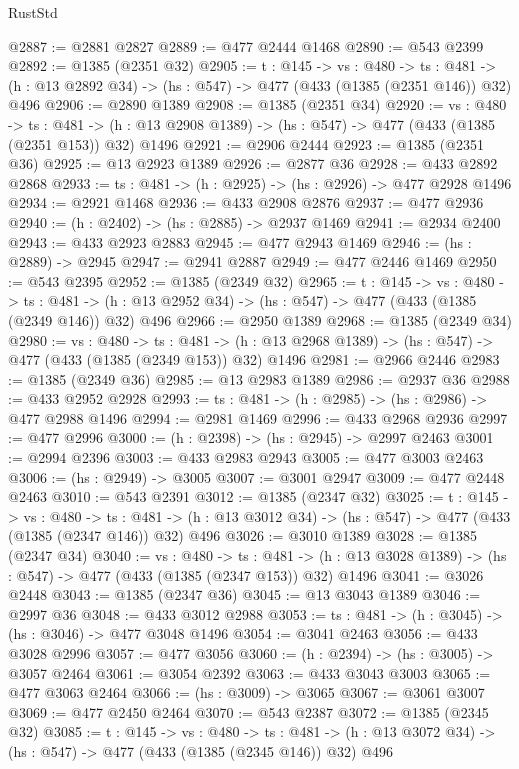 \begin{lexlean}{RustStd}
\begin{coremodule}
@2887 := @2881 @2827
@2889 := @477 @2444 @1468
@2890 := @543 @2399
@2892 := @1385 (@2351 @32)
@2905 := {t : @145} ->
  {vs : @480} ->
  {ts : @481} -> (h : @13 @2892 @34) -> (hs : @547) -> @477 (@433 (@1385 (@2351 @146)) @32) @496
@2906 := @2890 @1389
@2908 := @1385 (@2351 @34)
@2920 := {vs : @480} ->
  {ts : @481} -> (h : @13 @2908 @1389) -> (hs : @547) -> @477 (@433 (@1385 (@2351 @153)) @32) @1496
@2921 := @2906 @2444
@2923 := @1385 (@2351 @36)
@2925 := @13 @2923 @1389
@2926 := @2877 @36
@2928 := @433 @2892 @2868
@2933 := {ts : @481} -> (h : @2925) -> (hs : @2926) -> @477 @2928 @1496
@2934 := @2921 @1468
@2936 := @433 @2908 @2876
@2937 := @477 @2936
@2940 := (h : @2402) -> (hs : @2885) -> @2937 @1469
@2941 := @2934 @2400
@2943 := @433 @2923 @2883
@2945 := @477 @2943 @1469
@2946 := (hs : @2889) -> @2945
@2947 := @2941 @2887
@2949 := @477 @2446 @1469
@2950 := @543 @2395
@2952 := @1385 (@2349 @32)
@2965 := {t : @145} ->
  {vs : @480} ->
  {ts : @481} -> (h : @13 @2952 @34) -> (hs : @547) -> @477 (@433 (@1385 (@2349 @146)) @32) @496
@2966 := @2950 @1389
@2968 := @1385 (@2349 @34)
@2980 := {vs : @480} ->
  {ts : @481} -> (h : @13 @2968 @1389) -> (hs : @547) -> @477 (@433 (@1385 (@2349 @153)) @32) @1496
@2981 := @2966 @2446
@2983 := @1385 (@2349 @36)
@2985 := @13 @2983 @1389
@2986 := @2937 @36
@2988 := @433 @2952 @2928
@2993 := {ts : @481} -> (h : @2985) -> (hs : @2986) -> @477 @2988 @1496
@2994 := @2981 @1469
@2996 := @433 @2968 @2936
@2997 := @477 @2996
@3000 := (h : @2398) -> (hs : @2945) -> @2997 @2463
@3001 := @2994 @2396
@3003 := @433 @2983 @2943
@3005 := @477 @3003 @2463
@3006 := (hs : @2949) -> @3005
@3007 := @3001 @2947
@3009 := @477 @2448 @2463
@3010 := @543 @2391
@3012 := @1385 (@2347 @32)
@3025 := {t : @145} ->
  {vs : @480} ->
  {ts : @481} -> (h : @13 @3012 @34) -> (hs : @547) -> @477 (@433 (@1385 (@2347 @146)) @32) @496
@3026 := @3010 @1389
@3028 := @1385 (@2347 @34)
@3040 := {vs : @480} ->
  {ts : @481} -> (h : @13 @3028 @1389) -> (hs : @547) -> @477 (@433 (@1385 (@2347 @153)) @32) @1496
@3041 := @3026 @2448
@3043 := @1385 (@2347 @36)
@3045 := @13 @3043 @1389
@3046 := @2997 @36
@3048 := @433 @3012 @2988
@3053 := {ts : @481} -> (h : @3045) -> (hs : @3046) -> @477 @3048 @1496
@3054 := @3041 @2463
@3056 := @433 @3028 @2996
@3057 := @477 @3056
@3060 := (h : @2394) -> (hs : @3005) -> @3057 @2464
@3061 := @3054 @2392
@3063 := @433 @3043 @3003
@3065 := @477 @3063 @2464
@3066 := (hs : @3009) -> @3065
@3067 := @3061 @3007
@3069 := @477 @2450 @2464
@3070 := @543 @2387
@3072 := @1385 (@2345 @32)
@3085 := {t : @145} ->
  {vs : @480} ->
  {ts : @481} -> (h : @13 @3072 @34) -> (hs : @547) -> @477 (@433 (@1385 (@2345 @146)) @32) @496

\end{coremodule}
\end{lexlean}
